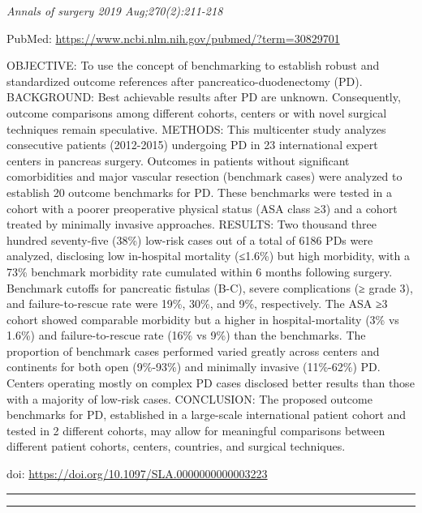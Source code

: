 \documentclass[]{article}
\begin{document}
\emph{Annals of surgery 2019 Aug;270(2):211-218}

PubMed: \url{https://www.ncbi.nlm.nih.gov/pubmed/?term=30829701}

OBJECTIVE: To use the concept of benchmarking to establish robust and
standardized outcome references after pancreatico-duodenectomy (PD).
BACKGROUND: Best achievable results after PD are unknown. Consequently,
outcome comparisons among different cohorts, centers or with novel
surgical techniques remain speculative. METHODS: This multicenter study
analyzes consecutive patients (2012-2015) undergoing PD in 23
international expert centers in pancreas surgery. Outcomes in patients
without significant comorbidities and major vascular resection
(benchmark cases) were analyzed to establish 20 outcome benchmarks for
PD. These benchmarks were tested in a cohort with a poorer preoperative
physical status (ASA class ≥3) and a cohort treated by minimally
invasive approaches. RESULTS: Two thousand three hundred seventy-five
(38\%) low-risk cases out of a total of 6186 PDs were analyzed,
disclosing low in-hospital mortality (≤1.6\%) but high morbidity, with a
73\% benchmark morbidity rate cumulated within 6 months following
surgery. Benchmark cutoffs for pancreatic fistulas (B-C), severe
complications (≥ grade 3), and failure-to-rescue rate were 19\%, 30\%,
and 9\%, respectively. The ASA ≥3 cohort showed comparable morbidity but
a higher in hospital-mortality (3\% vs 1.6\%) and failure-to-rescue rate
(16\% vs 9\%) than the benchmarks. The proportion of benchmark cases
performed varied greatly across centers and continents for both open
(9\%-93\%) and minimally invasive (11\%-62\%) PD. Centers operating
mostly on complex PD cases disclosed better results than those with a
majority of low-risk cases. CONCLUSION: The proposed outcome benchmarks
for PD, established in a large-scale international patient cohort and
tested in 2 different cohorts, may allow for meaningful comparisons
between different patient cohorts, centers, countries, and surgical
techniques.

doi: \url{https://doi.org/10.1097/SLA.0000000000003223}

{}

{}

\begin{center}\rule{0.5\linewidth}{\linethickness}\end{center}

\begin{center}\rule{0.5\linewidth}{\linethickness}\end{center}
\end{document}
